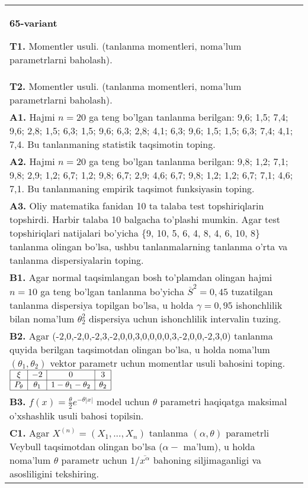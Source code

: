 \documentclass{article}
\begin{document}
\begin{tabular}{m{17cm}}
\textbf{65-variant}
\newline

\textbf{T1.} 
Momentler usuli. (tanlanma momentleri, noma'lum parametrlarni baholash).
\\
\textbf{T2.} 
Momentler usuli. (tanlanma momentleri, noma'lum parametrlarni baholash).
\\
\textbf{A1.} 
Hajmi \(n = 20\) ga teng bo'lgan tanlanma berilgan: 9,6; 1,5; 7,4; 9,6; 2,8; 1,5; 6,3; 1,5; 9,6; 6,3; 2,8; 4,1; 6,3; 9,6; 1,5; 1,5; 6,3; 7,4; 4,1; 7,4. Bu tanlanmaning statistik taqsimotin toping.
\\
\textbf{A2.} 
Hajmi \(n = 20\) ga teng bo'lgan tanlanma berilgan: 9,8; 1,2; 7,1; 9,8; 2,9; 1,2; 6,7; 1,2; 9,8; 6,7; 2,9; 4,6; 6,7; 9,8; 1,2; 1,2; 6,7; 7,1; 4,6; 7,1. Bu tanlanmaning empirik taqsimot funksiyasin toping.
\\
\textbf{A3.} 
Oliy matematika fanidan 10 ta talaba test topshiriqlarin topshirdi. Harbir talaba 10 balgacha to'plashi mumkin. Agar test topshiriqlari natijalari bo'yicha \{9, 10, 5, 6, 4, 8, 4, 6, 10, 8\} tanlanma olingan bo'lsa, ushbu tanlanmalarning tanlanma o'rta va tanlanma dispersiyalarin toping.
\\
\textbf{B1.} 
Agar normal taqsimlangan bosh to'plamdan olingan hajmi \(n = 10\) ga teng bo'lgan tanlanma bo'yicha \({\overline{S}}^{2} = 0,45\) tuzatilgan tanlanma dispersiya topilgan bo'lsa, u holda \(\gamma = 0,95\) ishonchlilik bilan noma'lum \(\theta_{2}^{2}\) dispersiya uchun ishonchlilik intervalin tuzing.
\\
\textbf{B2.} 
Agar (-2,0,-2,0,-2,3,-2,0,0,3,0,0,0,0,3,-2,0,0,-2,3,0) tanlanma quyida berilgan taqsimotdan olingan bo'lsa, u holda noma'lum \(\left( \theta_{1},\theta_{2} \right)\) vektor parametr uchun momentlar usuli bahosini toping.
$\begin{array}{|c|c|c|c|}
    \hline
    \xi & - 2 & 0 & 3\\
    \hline
    P_{\theta} & \theta_{1} & 1 - \theta_{1} - \theta_{2} & \theta_{2} \\
    \hline
\end{array}$
\\
\textbf{B3.} 
\(f(x) = \frac{\theta}{2}e^{- \theta|x|}\) model uchun \(\theta\) parametri haqiqatga maksimal o'xshashlik usuli bahosi topilsin.
\\
\textbf{C1.} 
Agar \(X^{(n)} = \left( X_{1},...,X_{n} \right)\) tanlanma \((\alpha,\theta)\) parametrli Veybull taqsimotdan olingan bo'lsa (\(\alpha -\) ma'lum), u holda noma'lum \(\theta\) parametr uchun \(1/\overline{x^{\alpha}}\) bahoning siljimaganligi va asosliligini tekshiring.

\end{tabular}
\end{document}
